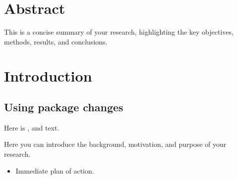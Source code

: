 \documentclass{article}
\begin{document}
\newpage
\tableofcontents %
\newpage

\section*{Abstract}

This is a concise summary of your research, highlighting the key objectives, methods, results, and conclusions. 

\section{Introduction}

\subsection{Using package changes}

Here is ,  and  text. 

Here you can introduce the background, motivation, and purpose of your research.

\begin{itemize}
  \item Immediate plan of action.
\end{itemize}

\end{document}
